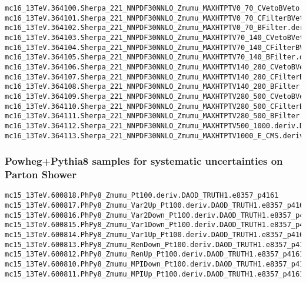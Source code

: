\begin{tiny}
\begin{verbatim}
mc16_13TeV.364100.Sherpa_221_NNPDF30NNLO_Zmumu_MAXHTPTV0_70_CVetoBVeto.deriv.DAOD_STDM7.e5271_s3126_r10724_p4357
mc16_13TeV.364101.Sherpa_221_NNPDF30NNLO_Zmumu_MAXHTPTV0_70_CFilterBVeto.deriv.DAOD_STDM7.e5271_s3126_r10724_p4357
mc16_13TeV.364102.Sherpa_221_NNPDF30NNLO_Zmumu_MAXHTPTV0_70_BFilter.deriv.DAOD_STDM7.e5271_s3126_r10724_p4357
mc16_13TeV.364103.Sherpa_221_NNPDF30NNLO_Zmumu_MAXHTPTV70_140_CVetoBVeto.deriv.DAOD_STDM7.e5271_s3126_r10724_p4357
mc16_13TeV.364104.Sherpa_221_NNPDF30NNLO_Zmumu_MAXHTPTV70_140_CFilterBVeto.deriv.DAOD_STDM7.e5271_s3126_r10724_p4357
mc16_13TeV.364105.Sherpa_221_NNPDF30NNLO_Zmumu_MAXHTPTV70_140_BFilter.deriv.DAOD_STDM7.e5271_s3126_r10724_p4357
mc16_13TeV.364106.Sherpa_221_NNPDF30NNLO_Zmumu_MAXHTPTV140_280_CVetoBVeto.deriv.DAOD_STDM7.e5271_s3126_r10724_p4357
mc16_13TeV.364107.Sherpa_221_NNPDF30NNLO_Zmumu_MAXHTPTV140_280_CFilterBVeto.deriv.DAOD_STDM7.e5271_s3126_r10724_p4357
mc16_13TeV.364108.Sherpa_221_NNPDF30NNLO_Zmumu_MAXHTPTV140_280_BFilter.deriv.DAOD_STDM7.e5271_s3126_r10724_p4357
mc16_13TeV.364109.Sherpa_221_NNPDF30NNLO_Zmumu_MAXHTPTV280_500_CVetoBVeto.deriv.DAOD_STDM7.e5271_s3126_r10724_p4357
mc16_13TeV.364110.Sherpa_221_NNPDF30NNLO_Zmumu_MAXHTPTV280_500_CFilterBVeto.deriv.DAOD_STDM7.e5271_s3126_r10724_p4357
mc16_13TeV.364111.Sherpa_221_NNPDF30NNLO_Zmumu_MAXHTPTV280_500_BFilter.deriv.DAOD_STDM7.e5271_s3126_r10724_p4357
mc16_13TeV.364112.Sherpa_221_NNPDF30NNLO_Zmumu_MAXHTPTV500_1000.deriv.DAOD_STDM7.e5271_s3126_r10724_p4357
mc16_13TeV.364113.Sherpa_221_NNPDF30NNLO_Zmumu_MAXHTPTV1000_E_CMS.deriv.DAOD_STDM7.e5271_s3126_r10724_p4357
\end{verbatim}
\end{tiny}

\subsubsection{Powheg+Pythia8 samples for systematic uncertainties on Parton Shower}
\begin{tiny}
\begin{verbatim}
mc15_13TeV.600818.PhPy8_Zmumu_Pt100.deriv.DAOD_TRUTH1.e8357_p4161
mc15_13TeV.600817.PhPy8_Zmumu_Var2Up_Pt100.deriv.DAOD_TRUTH1.e8357_p4161
mc15_13TeV.600816.PhPy8_Zmumu_Var2Down_Pt100.deriv.DAOD_TRUTH1.e8357_p4161
mc15_13TeV.600815.PhPy8_Zmumu_Var1Down_Pt100.deriv.DAOD_TRUTH1.e8357_p4161
mc15_13TeV.600814.PhPy8_Zmumu_Var1Up_Pt100.deriv.DAOD_TRUTH1.e8357_p4161
mc15_13TeV.600813.PhPy8_Zmumu_RenDown_Pt100.deriv.DAOD_TRUTH1.e8357_p4161
mc15_13TeV.600812.PhPy8_Zmumu_RenUp_Pt100.deriv.DAOD_TRUTH1.e8357_p4161
mc15_13TeV.600810.PhPy8_Zmumu_MPIDown_Pt100.deriv.DAOD_TRUTH1.e8357_p4161
mc15_13TeV.600811.PhPy8_Zmumu_MPIUp_Pt100.deriv.DAOD_TRUTH1.e8357_p4161

\end{verbatim}
\end{tiny}
